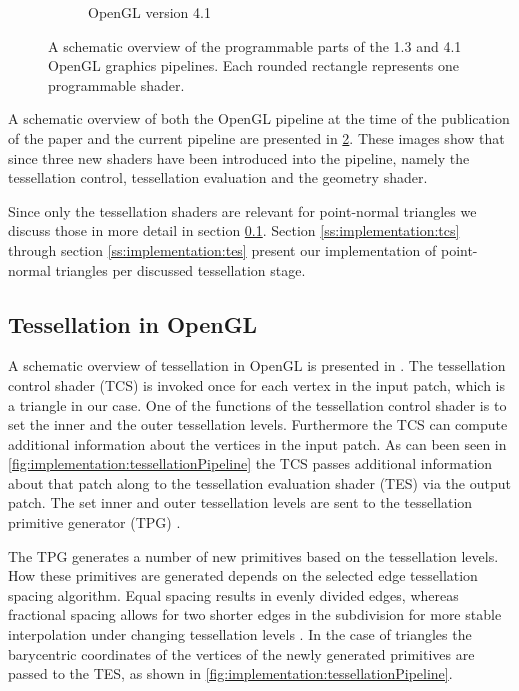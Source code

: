 \begin{figure}
\begin{subfigure}[b]{0.4\columnwidth}
		\caption{OpenGL version 4.1}
		\label{fig:implementation:pipeline:new}
	\end{subfigure}	
	\caption{A schematic overview of the programmable parts of the  1.3 and  4.1 OpenGL graphics pipelines. Each rounded rectangle represents one programmable shader.}
	\label{fig:implementation:pipeline}
\end{figure}

A schematic overview of both the OpenGL pipeline at the time of the publication of the paper and the current pipeline are presented in \cref{fig:implementation:pipeline}. These images show that since \citeyear{vlachos2001curved} three new shaders have been introduced into the pipeline, namely the tessellation control, tessellation evaluation and the geometry shader. 

Since only the tessellation shaders are relevant for point-normal triangles we discuss those in more detail in section \ref{ss:implementation:pipeline}. Section \ref{ss:implementation:tcs} through section \ref{ss:implementation:tes} present our implementation of point-normal triangles per discussed tessellation stage. 

\subsection{Tessellation in OpenGL}
\label{ss:implementation:pipeline}

	A schematic overview of tessellation in OpenGL is presented in .
	The tessellation control shader (TCS) is invoked once for each vertex in the input patch, which is a triangle in our case. 
	One of the functions of the tessellation control shader is to set the inner and the outer tessellation levels. Furthermore the TCS can compute additional information about the vertices in the input patch. 
	As can been seen in \cref{fig:implementation:tessellationPipeline} the TCS passes additional information about that patch along to the tessellation evaluation shader (TES) via the output patch. The set inner and outer tessellation levels are sent to the tessellation primitive generator (TPG) \cite{wolff2013opengl}.

	The TPG generates a number of new primitives based on the tessellation levels. How these primitives are generated depends on the selected edge tessellation spacing algorithm. Equal spacing results in evenly divided edges, whereas fractional spacing allows for two shorter edges in the subdivision for more stable interpolation under changing tessellation levels \cite{wolff2013opengl,openGL41Core}. In the case of triangles the barycentric coordinates of the vertices of the newly generated primitives are passed to the TES, as shown in \cref{fig:implementation:tessellationPipeline}.

